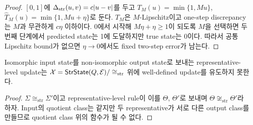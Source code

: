 \begin{proof}
$[0,1]$에 $\Delta_{\mathrm{str}}(u,v)=c|u-v|$를 두고
$T_M(u)=\min\{1,Mu\}$, $\widehat T_M(u)=\min\{1,Mu+\eta\}$로 둔다.
$T_M$은 $M$-Lipschitz이고 one-step discrepancy는 $M$과 무관하게
$c\eta$ 이하이다. 0에서 시작해 $M\eta+\eta\geq1$이 되도록 $M$을
선택하면 두 번째 단계에서 predicted state는 1에 도달하지만 true state는
0이다. 따라서 공통 Lipschitz bound가 없으면 $\eta\to0$에서도 fixed
two-step error가 남는다.
\end{proof}

\begin{proposition}
Isomorphic input state를 non-isomorphic output state로 보내는
representative-level update는
$\mathcal X=\mathsf{StrState}(Q,\mathcal E)/\cong_{\mathrm{str}}$ 위에
well-defined update를 유도하지 못한다.
\end{proposition}

\begin{proof}
$\Sigma\cong_{\mathrm{str}}\Sigma'$이고 representative-level rule이 이를
$\Theta$, $\Theta'$로 보내며 $\Theta\not\cong_{\mathrm{str}}\Theta'$라 하자.
Input의 quotient class는 같지만 두 representative가 서로 다른 output class를
만들므로 quotient class 위의 함수가 될 수 없다.
\end{proof}
